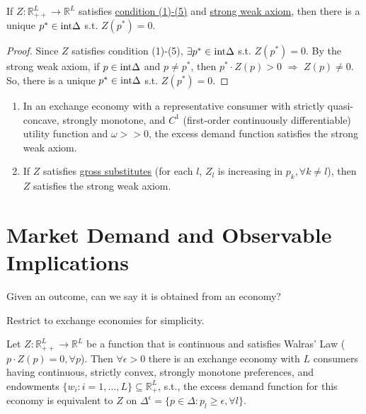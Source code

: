 \documentclass[11pt]{elegantbook}
\begin{document}
\begin{theorem}
    If $Z: \mathbb{R}_{++}^L \rightarrow \mathbb{R}^L$ satisfies \underline{condition (1)-(5)} and \underline{strong weak axiom}, then there is a unique $p^*\in \textnormal{int}\Delta$ s.t. $Z(p^*)=0$.
\end{theorem}
\begin{proof}
    Since $Z$ satisfies condition (1)-(5), $\exists p^*\in \textnormal{int}\Delta$ s.t. $Z(p^*)=0$. By the strong weak axiom, if $p\in \textnormal{int}\Delta$ and $p\neq p^*$, then $p^*\cdot Z(p)>0$ $\Rightarrow$ $Z(p)\neq 0$. So, there is a unique $p^*\in \textnormal{int}\Delta$ s.t. $Z(p^*)=0$.
\end{proof}
\begin{example}
    \begin{enumerate}
        \item In an exchange economy with a representative consumer with strictly quasi-concave, strongly monotone, and $C^1$ (first-order continuously differentiable) utility function and $\omega>>0$, the excess demand function satisfies the strong weak axiom.
        \item If $Z$ satisfies \underline{gross substitutes} (for each $l$, $Z_l$ is increasing in $p_k,\forall k\neq l$), then $Z$ satisfies the strong weak axiom.
    \end{enumerate}
\end{example}


\section{Market Demand and Observable Implications}
Given an outcome, can we say it is obtained from an economy?

Restrict to exchange economies for simplicity.

\begin{theorem}
    Let $Z: \mathbb{R}_{++}^L \rightarrow \mathbb{R}^L$ be a function that is continuous and satisfies Walras' Law ($p\cdot Z(p)=0, \forall p$). Then $\forall \epsilon>0$ there is an exchange economy with $L$ consumers having continuous, strictly convex, strongly monotone preferences, and endowments $\{w_i:i=1,...,L\}\subseteq \mathbb{R}_+^L$, s.t., the excess demand function for this economy is equivalent to $Z$ on $\Delta^\epsilon=\{p\in\Delta: p_l\geq \epsilon, \forall l\}$.
\end{theorem}
\end{document}
